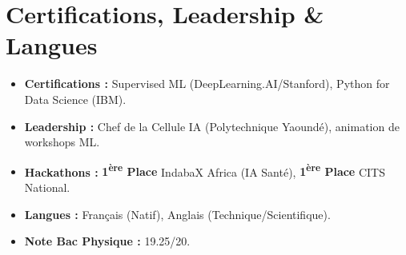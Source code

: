 \documentclass[a4paper,11pt]{article}
\begin{document}
\section{Certifications, Leadership \& Langues}
\begin{itemize}[leftmargin=*, nosep]
    \item \textbf{Certifications :} Supervised ML (DeepLearning.AI/Stanford), Python for Data Science (IBM).
    \item \textbf{Leadership :} Chef de la Cellule IA (Polytechnique Yaoundé), animation de workshops ML.
    \item \textbf{Hackathons :} \textbf{1\textsuperscript{ère} Place} IndabaX Africa (IA Santé), \textbf{1\textsuperscript{ère} Place} CITS National.
    \item \textbf{Langues :} Français (Natif), Anglais (Technique/Scientifique).
    \item \textbf{Note Bac Physique :} 19.25/20.
\end{itemize}
\end{document}
